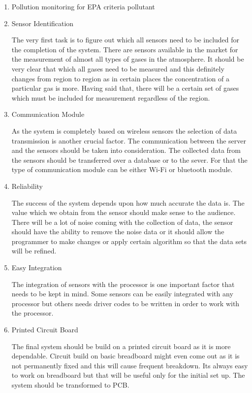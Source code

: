 \begin {enumerate}
\item{Pollution monitoring for EPA criteria pollutant}
\item{Sensor Identification}

The very first task is to figure out which all sensors need to be included for the completion of the system. There are sensors available in the market for the measurement of almost all types of gases in the atmosphere. It should be very clear that which all gases need to be measured and this definitely changes from region to region as in certain places the concentration of a particular gas is more. Having said that, there will be a certain set of gases which must be included for measurement regardless of the region.

\item{Communication Module}

As the system is completely based on wireless sensors the selection of data transmission is another crucial factor. The communication between the server and the sensors should be taken into consideration.
The collected data from the sensors should be transferred over a database or to the sever. For that the type of communication module can be either Wi-Fi or bluetooth module.
 
\item {Reliability}

The success of the system depends upon how much accurate the data is. The value which we obtain from the sensor should make sense to the audience. There will be a lot of noise coming with the  collection of data, the sensor should have the ability to remove the noise data or it should allow the programmer to make changes or apply certain algorithm so that the data sets will be refined.


\item {Easy Integration}

The integration of sensors with the processor is one important factor that needs to be kept in mind. Some sensors can be easily integrated with any processor but others needs driver codes to be written in order to work with the processor.

\item {Printed Circuit Board}

The final system should be build on a printed circuit board as it is more dependable. Circuit build on basic breadboard might even come out as it is not permanently fixed and this will cause frequent breakdown. Its always easy to work on breadboard but that will be useful only for the initial set up. The system should be transformed to PCB.



\end{enumerate}
